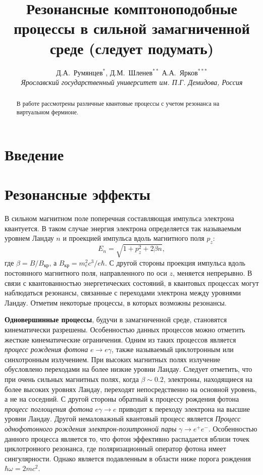 \documentclass[12pt]{article}
\title{Резонансные комптоноподобные процессы в сильной замагниченной среде (следует подумать)}
\author{Д.А.~Румянцев$^{*}$, Д.М.~Шленев$^{**}$
А.А.~Ярков$^{***}$
\\
{\it Ярославский государственный университет им. П.Г. Демидова, Россия}}
\date{}
\begin{document}
\large
\maketitle
\def\abstractname{\empty}
\baselineskip=22pt

\begin{abstract}

\baselineskip=20pt

{\large В работе рассмотрены различные квантовые процессы с учетом резонанса на виртуальном фермионе.}
\end{abstract}

{\def\thefootnote{*}
\def\thefootnote{**}
\def\thefootnote{***}
}

\newpage
\unitlength 1mm

\section{Введение}
\section{Резонансные эффекты}
	В сильном магнитном поле поперечная составляющая импульса электрона квантуется. В таком случае энергия электрона определяется так называемым уровнем Ландау $n$ и проекцией импульса вдоль магнитного поля $p_z$:
	\begin{equation}
		E_n = \sqrt{1+p_z^2+2\beta n},
	\end{equation}
	где $\beta=B/B_{кр}$, а $B_{кр} = m_e^2 c^3/e\hbar$. С другой стороны проекция импульса вдоль постоянного магнитного поля, направленного по оси $z$, меняется непрерывно. В связи с квантованностью энергетических состояний, в квантовых процессах могут наблюдаться резонансы, связанные с переходами электрона между уровнями Ландау. Отметим некоторые процессы, в которых возможны резонансы.
	
{\bf Одновершинные процессы}, будучи в замагниченной среде, становятся кинематически разрешены. Особенностью данных процессов можно отметить жесткие кинематические ограничения. Одним из таких процессов является \textit{процесс рождения фотона} $e\to e\gamma $, также называемый циклотронным или синхотронным излучением.  При высоких магнитных полях излучение обусловлено переходами на более низкие уровни Ландау. Следует отметить, 
что при очень сильных магнитных полях, когда $\beta\sim0.2$, электроны, находящиеся на более высоких уровнях Ландау, переходят непосредственно на основной уровень, а не на соседний. С другой стороны обратный к процессу рождения фотона \textit{процесс поглощения фотона} $e\gamma \to e$  приводит к переходу электрона на высшие уровни Ландау. Другой немаловажный квантовый процесс является \textit{Процесс однофотонного рождения электрон-позит\-ронной пары} $\gamma \to e^+e^-$. Особенностью данного процесса является то, что фотон эффективно распадается вблизи точек циклотронного резонанса, где поляризационный оператор фотона имеет сингулярности. 
Однако является подавленным в области ниже порога рождения $\hbar \omega = 2mc^2$.
		
\end{document}
